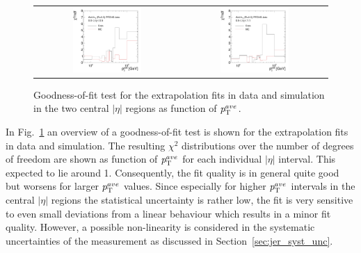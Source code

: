 \begin{figure}[!tp]
  \centering
  \begin{tabular}{cc}
                \includegraphics[width=0.49\textwidth]{figures/GoodnessOfFit_Eta0_final_nominal_v4.pdf} &
                \includegraphics[width=0.49\textwidth]{figures/GoodnessOfFit_Eta1_final_nominal_v4.pdf} \\
  \end{tabular}
  \caption{Goodness-of-fit test for the extrapolation fits in data and simulation in the two central $|\eta|$ regions as function of $p_{\text{T}}^{ave}$.}
  \label{fig:goodness-of-fit}
\end{figure}

In Fig.~\ref{fig:goodness-of-fit} an overview of a goodness-of-fit test is shown for the extrapolation fits in data and simulation. The resulting $\chi^2$ distributions over the number of degrees of freedom are shown as function of $p_{\text{T}}^{ave}$ for each individual $|\eta|$ interval. This expected to lie around 1. Consequently, the fit quality is in general quite good but worsens for larger $p_{\text{T}}^{ave}$ values. Since especially for higher $p_{\text{T}}^{ave}$ intervals in the central $|\eta|$ regions the statistical uncertainty is rather low, the fit is very sensitive to even small deviations from a linear behaviour which results in a minor fit quality. However, a possible non-linearity is considered in the systematic uncertainties of the measurement as discussed in Section~\ref{sec:jer_syst_unc}.

